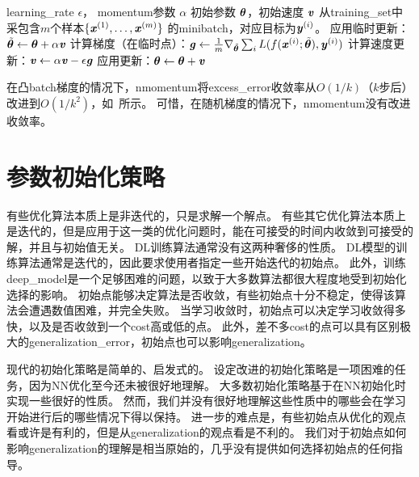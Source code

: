 \begin{algorithm}[ht]
\caption{使用\,\gls{nmomentum}的\gls{SGD}（）}
\label{alg:nesterov}
\begin{algorithmic}
\REQUIRE  \gls{learning_rate} $\epsilon$， \gls{momentum}参数 $\alpha$
\REQUIRE 初始参数 $\boldsymbol{\theta}$，初始速度 $\boldsymbol{\mathit{v}}$
    \STATE 从\gls{training_set}中采包含$m$个样本$\{ \boldsymbol{\mathit{x}}^{(1)},\dots, \boldsymbol{\mathit{x}}^{(m)}\}$ 的\gls{minibatch}，对应目标为$\boldsymbol{\mathit{y}}^{(i)}$。
    \STATE 应用临时更新： $\tilde{\boldsymbol{\theta}} \leftarrow \boldsymbol{\theta}  + \alpha \boldsymbol{\mathit{v}}$
         \STATE 计算梯度（在临时点）：$\boldsymbol{\mathit{g}} \leftarrow 
         \frac{1}{m} \nabla_{\tilde{\boldsymbol{\theta}}} \sum_i L(f(\boldsymbol{\mathit{x}}^{(i)};\tilde{\boldsymbol{\theta}}),\boldsymbol{\mathit{y}}^{(i)})$
    \STATE 计算速度更新：$\boldsymbol{\mathit{v}} \leftarrow \alpha \boldsymbol{\mathit{v}} - 
    \epsilon \boldsymbol{\mathit{g}}$
    \STATE 应用更新：$\boldsymbol{\theta} \leftarrow \boldsymbol{\theta} + \boldsymbol{\mathit{v}}$ 
\ENDWHILE
\end{algorithmic}
\end{algorithm}



在凸\gls{batch}梯度的情况下，\gls{nmomentum}将\gls{excess_error}收敛率从$O(1/k)$（$k$步后）改进到$O(1/k^2)$，如~\cite{Nesterov83b}所示。
可惜，在随机梯度的情况下，\gls{nmomentum}没有改进收敛率。


\section{参数初始化策略}
\label{sec:parameter_initialization_strategies}
有些优化算法本质上是非迭代的，只是求解一个解点。
有些其它优化算法本质上是迭代的，但是应用于这一类的优化问题时，能在可接受的时间内收敛到可接受的解，并且与初始值无关。
\gls{DL}训练算法通常没有这两种奢侈的性质。
\gls{DL}模型的训练算法通常是迭代的，因此要求使用者指定一些开始迭代的初始点。
此外，训练\gls{deep_model}是一个足够困难的问题，以致于大多数算法都很大程度地受到初始化选择的影响。
初始点能够决定算法是否收敛，有些初始点十分不稳定，使得该算法会遭遇数值困难，并完全失败。
当学习收敛时，初始点可以决定学习收敛得多快，以及是否收敛到一个\gls{cost}高或低的点。
此外，差不多\gls{cost}的点可以具有区别极大的\gls{generalization_error}，初始点也可以影响\gls{generalization}。


现代的初始化策略是简单的、启发式的。
设定改进的初始化策略是一项困难的任务，因为\gls{NN}优化至今还未被很好地理解。
大多数初始化策略基于在\gls{NN}初始化时实现一些很好的性质。
然而，我们并没有很好地理解这些性质中的哪些会在学习开始进行后的哪些情况下得以保持。
进一步的难点是，有些初始点从优化的观点看或许是有利的，但是从\gls{generalization}的观点看是不利的。
我们对于初始点如何影响\gls{generalization}的理解是相当原始的，几乎没有提供如何选择初始点的任何指导。

